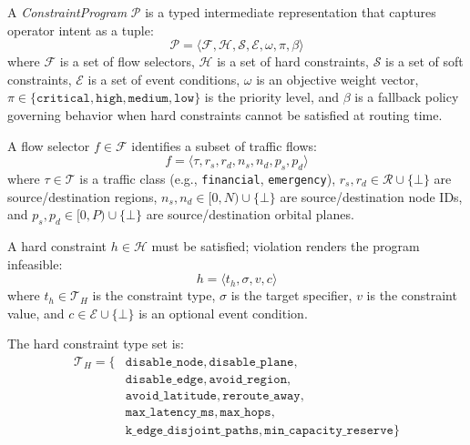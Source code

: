 
\begin{definition}[ConstraintProgram]
A \textit{ConstraintProgram} $\mathcal{P}$ is a typed intermediate representation
that captures operator intent as a tuple:
\begin{equation}
\mathcal{P} = \langle \mathcal{F}, \mathcal{H}, \mathcal{S}, \mathcal{E}, \omega, \pi, \beta \rangle
\end{equation}
where $\mathcal{F}$ is a set of flow selectors, $\mathcal{H}$ is a set of hard constraints,
$\mathcal{S}$ is a set of soft constraints, $\mathcal{E}$ is a set of event conditions,
$\omega$ is an objective weight vector, $\pi \in \{\texttt{critical}, \texttt{high},
\texttt{medium}, \texttt{low}\}$ is the priority level, and $\beta$ is a fallback
policy governing behavior when hard constraints cannot be satisfied at routing time.
\end{definition}

\begin{definition}
A flow selector $f \in \mathcal{F}$ identifies a subset of traffic flows:
\begin{equation}
f = \langle \tau, r_s, r_d, n_s, n_d, p_s, p_d \rangle
\end{equation}
where $\tau \in \mathcal{T}$ is a traffic class (e.g., \texttt{financial}, \texttt{emergency}),
$r_s, r_d \in \mathcal{R} \cup \{\bot\}$ are source/destination regions,
$n_s, n_d \in [0, N) \cup \{\bot\}$ are source/destination node IDs,
and $p_s, p_d \in [0, P) \cup \{\bot\}$ are source/destination orbital planes.
\end{definition}

\begin{definition}
A hard constraint $h \in \mathcal{H}$ must be satisfied; violation renders the
program infeasible:
\begin{equation}
h = \langle t_h, \sigma, v, c \rangle
\end{equation}
where $t_h \in \mathcal{T}_H$ is the constraint type, $\sigma$ is the target specifier,
$v$ is the constraint value, and $c \in \mathcal{E} \cup \{\bot\}$ is an optional
event condition.

The hard constraint type set is:
\begin{align}
\mathcal{T}_H = \{&\texttt{disable\_node}, \texttt{disable\_plane}, \nonumber \\
                   &\texttt{disable\_edge}, \texttt{avoid\_region}, \nonumber \\
                   &\texttt{avoid\_latitude}, \texttt{reroute\_away}, \nonumber \\
                   &\texttt{max\_latency\_ms}, \texttt{max\_hops}, \nonumber \\
                   &\texttt{k\_edge\_disjoint\_paths}, \texttt{min\_capacity\_reserve}\}
\end{align}
\end{definition}

